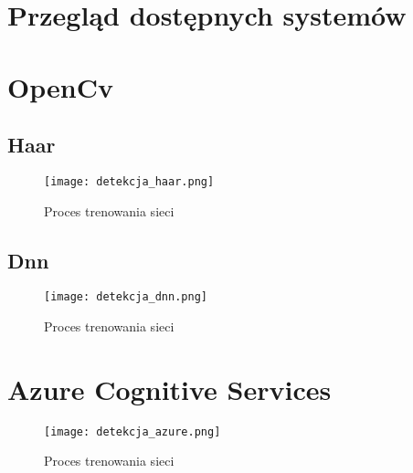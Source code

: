 \section{Przegląd dostępnych systemów}
\section{OpenCv}
\subsection{Haar}
\begin{figure}[H]
	\centering
	\texttt{[image: detekcja\_haar.png]}
	\caption{Proces trenowania sieci}
	\label{fig:trenowanie_proces}
\end{figure}
\subsection{Dnn}
\begin{figure}[H]
	\centering
	\texttt{[image: detekcja\_dnn.png]}
	\caption{Proces trenowania sieci}
	\label{fig:trenowanie_proces}
\end{figure}
\section{Azure Cognitive Services}
\begin{figure}[H]
	\centering
	\texttt{[image: detekcja\_azure.png]}
	\caption{Proces trenowania sieci}
	\label{fig:trenowanie_proces}
\end{figure}